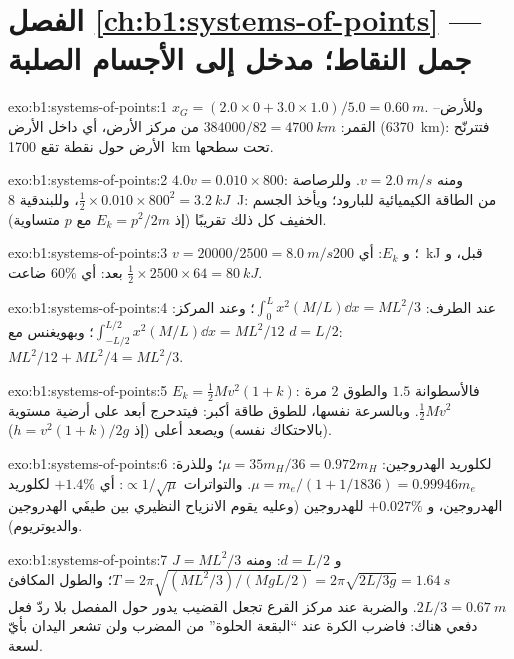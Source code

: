 \section*{الفصل \ref{ch:b1:systems-of-points} --- جمل النقاط؛ مدخل إلى الأجسام الصلبة}

\begin{solution}{exo:b1:systems-of-points:1}
$x_G = (2.0 \times 0 + 3.0 \times 1.0)/5.0 = \qty{0.60}{m}$. وللأرض--القمر:
$384000/82 = \qty{4700}{km}$ من مركز الأرض، أي داخل الأرض
(\qty{6370}{km}): فتترنّح الأرض حول نقطة تقع \qty{1700}{km} تحت
سطحها.
\end{solution}

\begin{solution}{exo:b1:systems-of-points:2}
$4.0v = 0.010 \times 800$: ومنه $v = \qty{2.0}{m/s}$. وللرصاصة $\tfrac12 \times 0.010
\times 800^2 = \qty{3.2}{kJ}$، وللبندقية \qty{8}{J}: من الطاقة الكيميائية
للبارود؛ ويأخذ الجسم الخفيف كل ذلك تقريبًا (إذ $E_k = p^2/2m$
مع $p$ متساوية).
\end{solution}

\begin{solution}{exo:b1:systems-of-points:3}
$v = 20000/2500 = \qty{8.0}{m/s}$؛ و $E_k$: أي \qty{200}{kJ} قبل، و $\tfrac12 \times
2500 \times 64 = \qty{80}{kJ}$ بعد: أي $60\%$ ضاعت.
\end{solution}

\begin{solution}{exo:b1:systems-of-points:4}
عند الطرف: $\int_0^L x^2(M/L)\dd x = ML^2/3$؛ وعند المركز: $\int_{-L/2}^{L/2}x^2(M/L)
\dd x = ML^2/12$؛ وبهويغنس مع $d = L/2$: $ML^2/12 + ML^2/4 = ML^2/3$.
\end{solution}

\begin{solution}{exo:b1:systems-of-points:5}
$E_k = \tfrac12 Mv^2(1 + k)$: فالأسطوانة $1.5$ والطوق $2$ مرة $\tfrac12 Mv^2$.
وبالسرعة نفسها، للطوق طاقة أكبر: فيتدحرج أبعد على أرضية مستوية
(بالاحتكاك نفسه) ويصعد أعلى (إذ $h = v^2(1 + k)/2g$).
\end{solution}

\begin{solution}{exo:b1:systems-of-points:6}
لكلوريد الهدروجين: $\mu = 35m_H/36 = 0.972m_H$؛ وللذرة: $\mu = m_e/(1 + 1/1836) =
0.99946m_e$. والتواترات $\propto 1/\sqrt\mu$: أي $+1.4\%$ لكلوريد الهدروجين، و $+0.027\%$
للهدروجين (وعليه يقوم الانزياح النظيري بين طيفَي الهدروجين والديوتريوم).
\end{solution}

\begin{solution}{exo:b1:systems-of-points:7}
$J = ML^2/3$ و $d = L/2$: ومنه $T = 2\pi\sqrt{(ML^2/3)/(MgL/2)} = 2\pi\sqrt{2L/3g}
= \qty{1.64}{s}$؛ والطول المكافئ $2L/3 = \qty{0.67}{m}$. والضربة عند
مركز القرع تجعل القضيب يدور حول المفصل بلا
ردّ فعل دفعي هناك: فاضرب الكرة عند ``البقعة الحلوة'' من المضرب
ولن تشعر اليدان بأيّ لسعة.
\end{solution}

